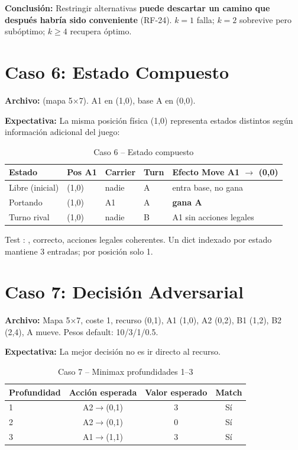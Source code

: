 \textbf{Conclusión:} Restringir alternativas \textbf{puede descartar un camino que después
habría sido conveniente} (RF-24). $k=1$ falla; $k=2$ sobrevive pero subóptimo; $k\ge4$
recupera óptimo.

\section{Caso 6: Estado Compuesto}
\label{sec:caso6-detalle}

\textbf{Archivo:}  (mapa 5$\times$7).
A1 en (1,0), base A en (0,0).

\textbf{Expectativa:} La misma posición física (1,0) representa estados distintos según
información adicional del juego:

\begin{table}[H]
\centering
\caption{Caso 6 -- Estado compuesto}
\begin{tabular}{lllll}
\toprule
Estado & Pos A1 & Carrier & Turn & Efecto Move A1 $\to$ (0,0) \\
\midrule
Libre (inicial) & (1,0) & nadie & A & entra base, no gana \\
Portando & (1,0) & A1 & A & \textbf{gana A} \\
Turno rival & (1,0) & nadie & B & A1 sin acciones legales \\
\bottomrule
\end{tabular}
\end{table}

Test : ,  correcto,
acciones legales coherentes. Un dict indexado por estado mantiene 3 entradas; por posición
solo 1.

\section{Caso 7: Decisión Adversarial}
\label{sec:caso7-detalle}

\textbf{Archivo:} 
Mapa 5$\times$7, coste 1, recurso (0,1), A1 (1,0), A2 (0,2), B1 (1,2), B2 (2,4), A mueve.
Pesos default: 10/3/1/0.5.

\textbf{Expectativa:} La mejor decisión no es ir directo al recurso.

\begin{table}[H]
\centering
\caption{Caso 7 -- Minimax profundidades 1--3}
\begin{tabular}{lccc}
\toprule
Profundidad & Acción esperada & Valor esperado & Match \\
\midrule
1 & A2$\to$(0,1) & 3 & Sí \\
2 & A2$\to$(0,1) & 0 & Sí \\
3 & A1$\to$(1,1) & 3 & Sí \\
\bottomrule
\end{tabular}
\end{table}

